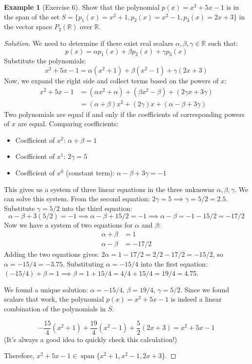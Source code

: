 \documentclass[11pt]{article}
\theoremstyle{definition}
\newtheorem{example}[theorem]{Example}
\theoremstyle{remark}
\begin{document}
\begin{example}[Exercise 6]
Show that the polynomial $p(x) = x^2 + 5x - 1$ is in the span of the set $S = \{ p_1(x)=x^2+1, p_2(x)=x^2-1, p_3(x)=2x+3 \}$ in the vector space $P_2(\mathbb{R})$ over $\mathbb{R}$.

\begin{proof}[Solution]
We need to determine if there exist real scalars $\alpha, \beta, \gamma \in \mathbb{R}$ such that:
\[ p(x) = \alpha p_1(x) + \beta p_2(x) + \gamma p_3(x) \]
Substitute the polynomials:
\[ x^2 + 5x - 1 = \alpha(x^2+1) + \beta(x^2-1) + \gamma(2x+3) \]
Now, we expand the right side and collect terms based on the powers of $x$:
\begin{align*} x^2 + 5x - 1 &= (\alpha x^2 + \alpha) + (\beta x^2 - \beta) + (2\gamma x + 3\gamma) \\ &= (\alpha + \beta)x^2 + (2\gamma)x + (\alpha - \beta + 3\gamma) \end{align*}
Two polynomials are equal if and only if the coefficients of corresponding powers of $x$ are equal. Comparing coefficients:
\begin{itemize}
    \item Coefficient of $x^2$: $\alpha + \beta = 1$
    \item Coefficient of $x^1$: $2\gamma = 5$
    \item Coefficient of $x^0$ (constant term): $\alpha - \beta + 3\gamma = -1$
\end{itemize}
This gives us a system of three linear equations in the three unknowns $\alpha, \beta, \gamma$. We can solve this system.
From the second equation: $2\gamma = 5 \implies \gamma = 5/2 = 2.5$.
Substitute $\gamma=5/2$ into the third equation:
\[ \alpha - \beta + 3(5/2) = -1 \implies \alpha - \beta + 15/2 = -1 \implies \alpha - \beta = -1 - 15/2 = -17/2 \]
Now we have a system of two equations for $\alpha$ and $\beta$:
\begin{align*} \alpha + \beta &= 1 \\ \alpha - \beta &= -17/2 \end{align*}
Adding the two equations gives: $2\alpha = 1 - 17/2 = 2/2 - 17/2 = -15/2$, so $\alpha = -15/4 = -3.75$.
Substituting $\alpha = -15/4$ into the first equation: $(-15/4) + \beta = 1 \implies \beta = 1 + 15/4 = 4/4 + 15/4 = 19/4 = 4.75$.

We found a unique solution: $\alpha = -15/4$, $\beta = 19/4$, $\gamma = 5/2$. Since we found scalars that work, the polynomial $p(x) = x^2+5x-1$ is indeed a linear combination of the polynomials in $S$.

\[ -\frac{15}{4}(x^2+1) + \frac{19}{4}(x^2-1) + \frac{5}{2}(2x+3) = x^2+5x-1 \]
(It's always a good idea to quickly check this calculation!)

Therefore, $x^2+5x-1 \in \operatorname{span}\{x^2+1, x^2-1, 2x+3\}$.
\end{proof}
\end{example}
\end{document}
